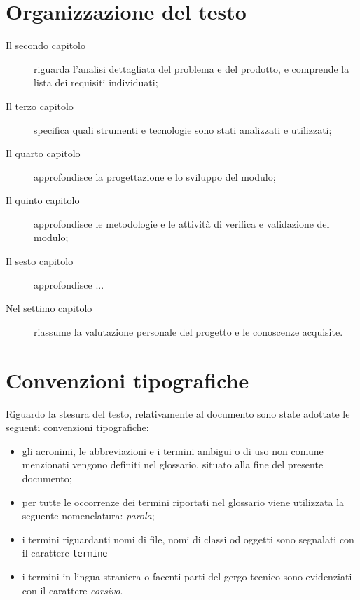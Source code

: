\section{Organizzazione del testo}

\begin{description}
    \item[{\hyperref[cap:analisi-del-problema]{Il secondo capitolo}}] riguarda l'analisi dettagliata del problema e del prodotto, e comprende la lista dei requisiti individuati;
    
    \item[{\hyperref[cap:strumenti-e-tecnologie]{Il terzo capitolo}}] specifica quali strumenti e tecnologie sono stati analizzati e utilizzati;
    
    \item[{\hyperref[cap:analisi-requisiti]{Il quarto capitolo}}] approfondisce la progettazione e lo sviluppo del modulo;
    
    \item[{\hyperref[cap:verifica-validazione]{Il quinto capitolo}}] approfondisce le metodologie e le attività di verifica e validazione del modulo;
    
    \item[{\hyperref[cap:verifica-validazione]{Il sesto capitolo}}] approfondisce ...
    
    \item[{\hyperref[cap:conclusioni]{Nel settimo capitolo}}] riassume la valutazione personale del progetto e le conoscenze acquisite.
\end{description}

\section{Convenzioni tipografiche}

Riguardo la stesura del testo, relativamente al documento sono state adottate le seguenti convenzioni tipografiche:
\begin{itemize}
	\item gli acronimi, le abbreviazioni e i termini ambigui o di uso non comune menzionati vengono definiti nel glossario, situato alla fine del presente documento;
	\item per tutte le occorrenze dei termini riportati nel glossario viene utilizzata la seguente nomenclatura: \emph{parola}\glsfirstoccur;
	\item i termini riguardanti nomi di file, nomi di classi od oggetti sono segnalati con il carattere \texttt{termine}
	\item i termini in lingua straniera o facenti parti del gergo tecnico sono evidenziati con il carattere \emph{corsivo}.
\end{itemize}